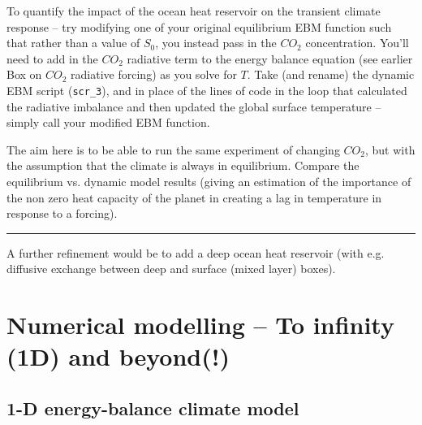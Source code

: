 \documentclass{tufte-book} %
\begin{document}
\noindent To quantify the impact of the ocean heat reservoir on the transient climate response -- try modifying one of your original equilibrium EBM function such that rather than a value of \(S_{0}\), you instead pass in the \(CO_{2}\) concentration. You'll need to add in the \(CO_{2}\) radiative term to the energy balance equation (see earlier Box on \(CO_{2}\) radiative forcing) as you solve for \(T\). Take (and rename) the dynamic EBM script (\texttt{scr\_3}), and in place of the lines of code in the loop that calculated the radiative imbalance and then updated the global surface temperature -- simply call your modified EBM function.

The aim here is to be able to run the same experiment of changing \(CO_{2}\), but with the assumption that the climate is always in equilibrium. Compare the equilibrium vs. dynamic model results (giving an estimation of the importance of the non zero heat capacity of the planet in creating a  lag in temperature in response to a forcing).



\vspace{1mm}
\noindent\rule{4cm}{0.5pt}
\vspace{2mm}

\noindent A further refinement would be to add a deep ocean heat reservoir (with e.g. diffusive exchange between deep and surface (mixed layer) boxes).


\chapter{Numerical modelling -- To infinity (1D) and beyond(!)}
\label{ch:08}


\newpage


\section{1-D energy-balance climate model}
\end{document}
